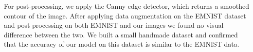 \documentclass[11pt, a4paper]{report}
\begin{document}
For post-processing, we apply the Canny edge detector, which returns a smoothed contour of the image. After applying data augmentation on the EMNIST dataset and post-processing on both EMNIST and our images we found no visual difference between the two. We built a small handmade dataset and confirmed that the accuracy of our model on this dataset is similar to the EMNIST data.
 


\begin{figure}[!h]
	\begin{center}
		\hspace{1cm}
		\\

\end{center}
\end{figure}
\end{document}
